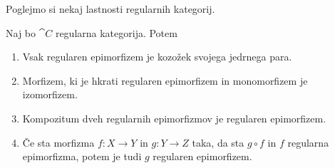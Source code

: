 \documentclass[../kategoricna_logika.tex]{subfiles}
\begin{document}
Poglejmo si nekaj lastnosti regularnih kategorij.
\begin{lema}\label{lema:lastnosti-regularnih-epimorfizmov}
  Naj bo $\cat{C}$ regularna kategorija. Potem
  \begin{enumerate}[label=(\roman*), nosep]
  \item Vsak regularen epimorfizem je kozožek svojega jedrnega para.
  \item Morfizem, ki je hkrati regularen epimorfizem in monomorfizem
    je izo\-morfizem.
  \item Kompozitum dveh regularnih epimorfizmov je regularen
    epimorfizem.
  \item Če sta morfizma $f : X \to Y$ in $g : Y \to Z$ taka, da sta
    $g \circ f$ in $f$ regularna epimorfizma, potem je tudi $g$
    regularen epimorfizem.
  \end{enumerate}
\end{lema}
\end{document}
